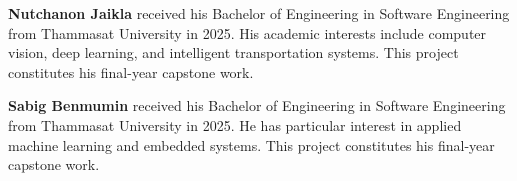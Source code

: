 \documentclass[12pt]{report}
\begin{document}
\noindent\textbf{Nutchanon Jaikla} received his Bachelor of Engineering in Software Engineering from Thammasat University in 2025.
His academic interests include computer vision, deep learning, and intelligent transportation systems.
This project constitutes his final-year capstone work.

\vspace{1em}
\noindent\textbf{Sabig Benmumin} received his Bachelor of Engineering in Software Engineering from Thammasat University in 2025.
He has particular interest in applied machine learning and embedded systems.
This project constitutes his final-year capstone work.
\end{document}
